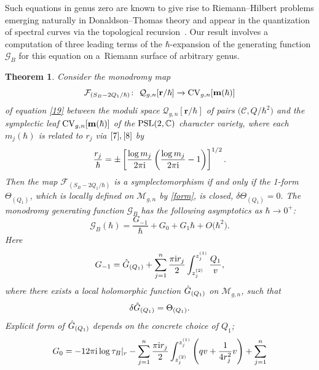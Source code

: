 \documentclass[pdftex]{sigma}
\numberwithin{equation}{section}
\newtheorem{Theorem}{Theorem}[section]
\theoremstyle{definition}
\newcommand{\CC}{\mathbb{C}}
\begin{document}
Such equations in genus zero are known to give rise to Riemann--Hilbert problems emerging naturally in Donaldson--Thomas theory \cite{Bri, BM} and appear in the quantization of spectral curves via the topological recursion~\cite{iwaki}. Our result involves a computation of three leading terms of the $\hbar$-expansion of the generating function $\mathcal{G}_B$ for this equation on a~Riemann surface of arbitrary genus.

\begin{Theorem}
Consider the monodromy map
\begin{equation*}\mathcal{F}_{(S_B-2Q_1/\hbar)}\colon \ \mathcal{Q}_{g,n}[\mathbf{r}/\hbar] \xrightarrow[]{} {\rm CV}_{g,n}[\mathbf{m}(\hbar)]\end{equation*}
of equation \eqref{19} between the moduli space $\mathcal{Q}_{g,n}[\mathbf{r}/\hbar]$ of pairs $\big(\mathcal{C}, Q/\hbar^2\big)$ and the symplectic leaf ${\rm CV}_{g,n}[\mathbf{m}(\hbar)]$ of the ${\rm PSL}(2, \CC)$ character variety, where each $m_j(\hbar)$ is related to $r_j$ via $\eqref{7},\eqref{8}$ by
\begin{equation*}
\frac{r_j}{\hbar}=\pm \left[\frac{\log m_j}{2 \pi {\rm i} } \left(\frac{\log m_j}{2 \pi {\rm i} }-1 \right)\right]^{1/2}. \end{equation*}
Then the map $\mathcal{F}_{(S_B-2Q_1/\hbar)}$ is a symplectomorphism if and only if the 1-form $\Theta_{(Q_1)}$, which is locally defined on $\mathcal{M}_{g,n}$ by \eqref{form}, is closed, $\delta\Theta_{(Q_1)}=0.$ The monodromy generating function $\mathcal{G}_B$ has the following asymptotics as $\hbar \xrightarrow{} 0^+$:
\begin{equation*}%
\mathcal{G}_B(\hbar)=\frac{G_{-1}}{\hbar}+G_0+G_1 \hbar + O\big(\hbar^2\big).\end{equation*}
Here
\begin{equation*}%
G_{-1} =\Hat{G}_{(Q_1)}+\sum^n_{j=1}\frac{\pi {\rm i} r_j}{2}
\int^{z^{(1)}_j}_{z^{(2)}_j}\frac{{Q}_1}{v} , \end{equation*} where there exists a local holomorphic function $\Hat{G}_{(Q_1)}$ on $\mathcal{M}_{g,n}$, such that
\begin{equation*}\delta\Hat{G}_{(Q_1)}=\Theta_{(Q_1)}.\end{equation*}
 Explicit form of $\Hat{G}_{(Q_1)}$ depends on the concrete choice of $Q_1$;
\begin{equation*}%
G_{0}=-12 \pi {\rm i} \log \tau_B|_{r} -\sum^n_{j=1}\frac{\pi {\rm i} r_j}{2} \int^{z^{(1)}_j}_{z^{(2)}_j}\left(qv+\frac{1}{4r^2_j}v \right)+\sum^n_{j=1}

\end{equation*}
\end{Theorem}
\end{document}
